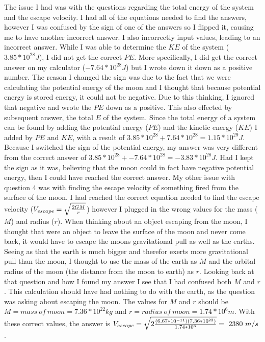 \documentclass[12pt]{article}
\begin{document}
	The issue I had was with the questions regarding the total energy of the system and the escape velocity. I had all of the equations needed to find the answers, however I was confused by the sign of one of the answers so I flipped it, causing me to have another incorrect answer. I also incorrectly input values, leading to an incorrect answer. While I was able to determine the $KE$ of the system ($3.85*10^{28}J$), I did not get the correct $PE$. More specifically, I did get the correct answer on my calculator ($-7.64*10^{28}J$) but I wrote down it down as a positive number. The reason I changed the sign was due to the fact that we were calculating the potential energy of the moon and I thought that because potential energy is stored energy, it could not be negative. Due to this thinking, I ignored that negative and wrote the $PE$ down as a positive. This also effected by subsequent answer, the total $E$ of the system. Since the total energy of a system can be found by adding the potential energy ($PE$) and the kinetic energy ($KE$) I added by $PE$ and $KE$, with a result of ${3.85*10^{28}}+{7.64*10^{28}}={1.15*10^{29}J}$. Because I switched the sign of the potential energy, my answer was very different from the correct answer of ${3.85*10^{28}}+{-7.64*10^{28}}={-3.83*10^{28}J}$. Had I kept the sign as it was, believing that the moon could in fact have negative potential energy, then I could have reached the correct answer. My other issue with question 4 was with finding the escape velocity of something fired from the surface of the moon. I had reached the correct equation needed to find the escape velocity ($V_{escape}={\sqrt{2GM \over r}}$) however I plugged in the wrong values for the mass ($M$) and radius ($r$). When thinking about an object escaping from the moon, I  thought that were an object to leave the surface of the moon and never come back, it would have to escape the moons gravitational pull as well as the earths. Seeing as that the earth is much bigger and therefor exerts more gravitational pull than the moon, I thought to use the mass of the earth as $M$ and the orbital radius of the moon (the distance from the moon to earth) as $r$. Looking back at that question and how I found my answer I see that I had confused both $M$ and $r$. This calculation should have had nothing to do with the earth, as the question was asking about escaping the moon. The values for $M$ and $r$ should be $M=mass \ of \ moon=7.36*10^ {22}kg$ and $r=radius \ of \ moon=1.74*10^{6}m$. With these correct values, the answer is $V_{escape}={\sqrt{2{(6.67*10^{-11})({7.36*10^{22})} \over {1.74*10^{6}}}}}=~2380 \ m/s$ .
\end{document}
